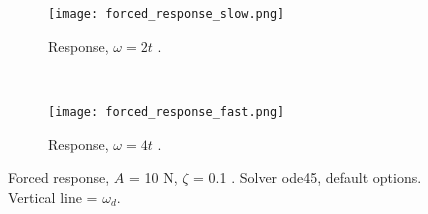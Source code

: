 \documentclass{article}
\begin{document}
	\begin{figure}[h!]
		\centering
		\begin{subfigure}[t]{0.41\textwidth}
			\texttt{[image: forced\_response\_slow.png]}
			\caption{Response, $\omega = 2 t$ .}
		\end{subfigure}
		~
		\begin{subfigure}[t]{0.41\textwidth}
			\texttt{[image: forced\_response\_fast.png]}
			\caption{Response, $\omega = 4 t$ .}
		\end{subfigure}
		\caption{Forced response, $A$ = 10 N, $\zeta$ = 0.1 . Solver ode45, default options. Vertical line = $\omega_d$.}
		\label{fig:forced_response}
	\end{figure}
\end{document}
